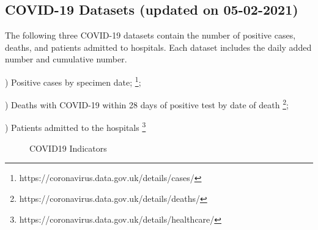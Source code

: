 \documentclass[12pt, a4paper]{report}
\begin{document}
\subsection{COVID-19 Datasets (updated on 05-02-2021)}
The following three COVID-19 datasets contain the number of positive cases, deaths, and patients admitted to hospitals. 
Each dataset includes the daily added number and cumulative number.\par
{}) Positive cases by specimen date;
\footnote[1]{https://coronavirus.data.gov.uk/details/cases/};\par
{}) Deaths with COVID-19 within 28 days of positive test by date of death
\footnote[2]{https://coronavirus.data.gov.uk/details/deaths/};\par
{}) Patients admitted to the hospitals
\footnote[3]{https://coronavirus.data.gov.uk/details/healthcare/}\par
\begin{figure}[H]
\centering
    \caption{COVID19 Indicators}
    \label{Fig.main}
\end{figure}
\end{document}
